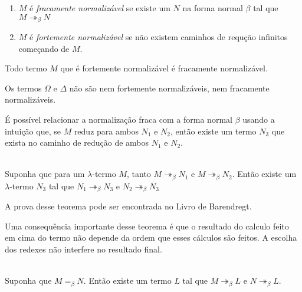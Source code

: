 \documentclass[../main.tex]{subfiles}
\begin{document}
\begin{definition}
    \hfill
    \begin{enumerate}
        \item $M$ é \emph{fracamente normalizável} se existe um $N$ na forma normal $\beta$ tal que $M \twoheadrightarrow_{\beta} N$ 
        \item $M$ é \emph{fortemente normalizável} se não existem caminhos de requção infinitos começando de $M$.
    \end{enumerate}
\end{definition}

Todo termo $M$ que é fortemente normalizável é fracamente normalizável.

Os termos $\Omega$ e $\Delta$ não são nem fortemente normalizáveis, nem fracamente normalizáveis. 

É possível relacionar a normalização fraca com a forma normal $\beta$ usando a intuição que, se $M$ reduz para ambos $N_1$ e $N_2$, então existe um termo $N_3$ que exista no caminho de redução de ambos $N_1$ e $N_2$.

\begin{theorem}
    \hfill\\
    Suponha que para um $\lambda$-termo $M$, tanto $M \twoheadrightarrow_{\beta} N_1$ e $M \twoheadrightarrow_{\beta} N_2$. Então existe um $\lambda$-termo $N_3$ tal que $N_1 \twoheadrightarrow_{\beta} N_3$ e $N_2 \twoheadrightarrow_{\beta} N_3$
\end{theorem}

A prova desse teorema pode ser encontrada no Livro de Barendregt.

Uma consequência importante desse teorema é que o resultado do calculo feito em cima do termo não depende da ordem que esses cálculos são feitos. A escolha dos redexes não interfere no resultado final.

\begin{corollary}
    \hfill\\
    Suponha que $M =_{\beta} N$. Então existe um termo $L$ tal que $M \twoheadrightarrow_{\beta} L$ e $N \twoheadrightarrow_{\beta} L$.
\end{corollary}
\end{document}
